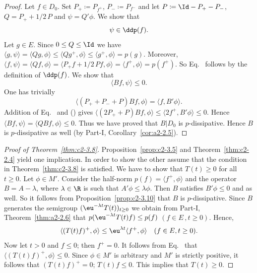 \begin{proof}
Let $f \in D_{0}$. 
Set $P_{+} \coloneqq P_{f^{+}}$, $P_{-} \coloneqq P_{f^{-}}$ and let
$P \coloneqq \Id - P_{+} - P_{-}$, $Q = P_{+} + 1/2 \, P$ and $\psi = Q'\phi$. We show that
\begin{equation}\label{eq:c2-3.2}
\psi \in \ddp(f).
\end{equation}
Let $g \in E$. 
Since $0 \leq Q \leq \Id$ we have 
$\langle g,\psi \rangle = \langle Qg,\phi \rangle \leq \langle Qg^{+},\phi \rangle \leq
\langle g^{+},\phi \rangle = p(g)$. 
Moreover, $\langle f, \psi \rangle = \langle Qf,\phi \rangle = \langle P_{+}f + 1/2 \, Pf,\phi \rangle = \langle f^{+},\phi \rangle = p(f^{+})$. 
So Eq.~ follows by the definition of\/ $\ddp(f)$. 
We show that
\begin{equation}\label{eq:c2-3.3}
\langle Bf,\psi \rangle \leq 0.
\end{equation}
One has trivially
\begin{equation}\label{eq:c2-3.4}
\langle(P_{+} + P_{-} + P) Bf,\phi \rangle = \langle f,B'\phi \rangle.
\end{equation}
Addition of Eq.~ and ()   gives
$\langle(2P_{+} + P)Bf,\phi \rangle \leq \langle 2f^{+},B'\phi \rangle \leq 0$.
Hence $\langle Bf,\psi \rangle = \langle QBf,\phi \rangle \leq 0$.
Thus we have proved that $B|D_{0}$ is $p$-dissipative. 
Hence $B$ is $p$-dissipative as well (by Part-I, Corollary~\ref{cor:a2-2.5}).
\end{proof}
\begin{proof}[Proof of Theorem~\ref{thm:c2-3.8}]
Proposition~\ref{prop:c2-3.5} and Theorem~\ref{thm:c2-2.4}   yield one implication. 
In order to show the other assume that the condition in
Theorem~\ref{thm:c2-3.8}   is satisfied. 
We have to show that $T(t) \geq 0$ for all $t \geq 0$.
Let $\phi \in M'$. 
Consider the half-norm $p(f) = \langle f^{+},\phi \rangle$ and the operator $B = A - \lambda$, where $\lambda \in \R$ is such that $A'\phi \leq \lambda\phi$. 
Then $B$ satisfies $B'\phi \leq 0$ and    as well. 
So it follows from Proposition~\ref{prop:c2-3.10}   that $B$ is $p$-dissipative.
Since $B$ generates the semigroup $(\eu^{-\lambda t}T(t))_{t \geq 0}$ we obtain from Part-I, Theorem~\ref{thm:a2-2.6} that $p(\eu^{-\lambda t}T(t)f) \leq p(f)$ $(f \in E\, , t\geq 0)$.
Hence,
\begin{equation} \label{eq:c2-3.5}
\langle (T(t)f)^{+}, \phi \rangle \leq \eu^{\lambda t} \langle f^{+}, \phi \rangle \quad (f \in E, t \geq 0).
\end{equation}
Now let $t > 0$ and $f \leq 0$; then $f^{+} = 0$. 
It follows from Eq.~ that $\langle (T(t)f)^{+},\phi \rangle \leq 0$.
Since $\phi \in M'$ is arbitrary and $M'$ is strictly positive, it follows that $(T(t)f)^{+} = 0$; \ie $T(t)f \leq 0$. 
This implies that $T(t) \geq 0$.
\end{proof}
